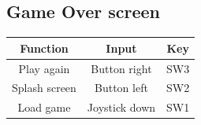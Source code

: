\documentclass{article}
\begin{document}
\subsection*{Game Over screen}
\begin{center}
\begin{tabular}{ c c c }
Function 	& Input 		& Key \\ \hline
Play again	& Button right	& SW3	\\
Splash screen& Button left 	& SW2 	\\
Load game 	& Joystick down 	& SW1	\\
\end{tabular}
\end{center}

\clearpage

\end{document}
